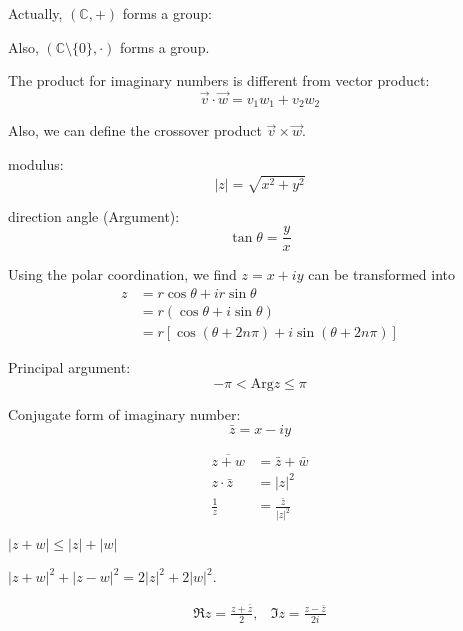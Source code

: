 Actually, $(\mathbb{C},+)$ forms a group:


Also, $(\mathbb{C}\setminus\{0\},\cdot)$ forms a group.

The product for imaginary numbers is different from vector product:
\[
\vec v\cdot\vec w = v_1w_1+v_2w_2
\]

Also, we can define the crossover product $\vec v\times\vec w$.

modulus:
\[
|z| = \sqrt{x^2+y^2}
\]

direction angle (Argument):
\[
\tan\theta=\frac{y}{x}
\]

Using the polar coordination, we find $z=x+iy$ can be transformed into
\begin{align*}
z&=r\cos\theta+ir\sin\theta\\
&=r(\cos\theta+i\sin\theta)\\
&=r\left[\cos(\theta+2n\pi) + i\sin(\theta+2n\pi)\right]
\end{align*}

Principal argument:
\[
-\pi<\mbox{Arg}z\le\pi
\]

Conjugate form of imaginary number:
\[
\bar z = x-iy
\]

\begin{align*}
\overline{z+w} &=\bar z + \bar w\\
z\cdot\bar z&=|z|^2\\
\frac{1}{z}&=\frac{\bar z}{|z|^2}
\end{align*}
\begin{proposition}
$|z+w|\le|z|+|w|$
\end{proposition}
\begin{proposition}
$|z+w|^2+|z-w|^2=2|z|^2+2|w|^2$.
\end{proposition}
\begin{proposition}
\begin{eqnarray*}
\Re z=\frac{z+\bar z}{2},
&
\Im z=\frac{z-\bar z}{2i}
\end{eqnarray*}
\end{proposition}


















